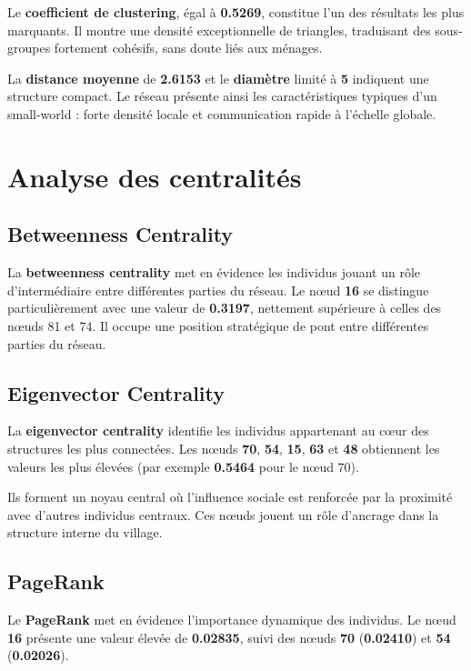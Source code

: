 \documentclass[10pt,twocolumn]{article}
\begin{document}
Le \textbf{coefficient de clustering}, égal à \textbf{0.5269}, constitue l’un des résultats les plus marquants. 
Il montre une densité exceptionnelle de triangles, traduisant des sous-groupes fortement cohésifs, sans doute liés 
aux ménages.

La \textbf{distance moyenne} de \textbf{2.6153} et le \textbf{diamètre} limité à \textbf{5} indiquent une structure compact. 
Le réseau présente ainsi les caractéristiques typiques d’un small-world : forte densité locale et communication rapide 
à l’échelle globale.

\section{Analyse des centralités}

\subsection{Betweenness Centrality}

La \textbf{betweenness centrality} met en évidence les individus jouant un rôle d’intermédiaire entre différentes parties 
du réseau. Le nœud \textbf{16} se distingue particulièrement avec une valeur de \textbf{0.3197}, nettement supérieure 
à celles des nœuds 81 et 74.  
Il occupe une position stratégique de pont entre différentes parties du réseau.

\subsection{Eigenvector Centrality}

La \textbf{eigenvector centrality} identifie les individus appartenant au cœur des structures les plus connectées. 
Les nœuds \textbf{70}, \textbf{54}, \textbf{15}, \textbf{63} et \textbf{48} obtiennent les valeurs les plus élevées 
(par exemple \textbf{0.5464} pour le nœud 70).  

Ils forment un noyau central où l’influence sociale est renforcée par la proximité avec d’autres individus centraux. 
Ces nœuds jouent un rôle d’ancrage dans la structure interne du village.

\subsection{PageRank}

Le \textbf{PageRank} met en évidence l’importance dynamique des individus. 
Le nœud \textbf{16} présente une valeur élevée de \textbf{0.02835}, suivi des nœuds \textbf{70} 
(\textbf{0.02410}) et \textbf{54} (\textbf{0.02026}).  
\end{document}
